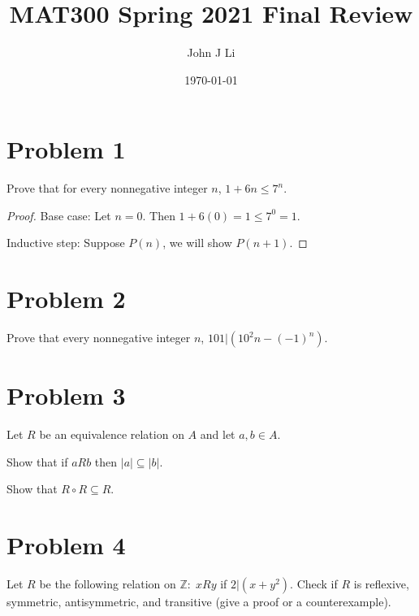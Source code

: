 \documentclass{article}
\title{MAT300 Spring 2021 Final Review}
\date{\today}
\author{John J Li}
\begin{document}
    \maketitle
    \thispagestyle{empty}


    \section*{Problem 1}

    Prove that for every nonnegative integer $n$, $1+6n\leq 7^n$.

    \begin{proof}
        Base case: Let $n=0$. Then $1+6(0) = 1 \leq 7^0 = 1$.

        Inductive step: Suppose $P(n)$, we will show $P(n+1)$.
    \end{proof}


    \section*{Problem 2}

    Prove that every nonnegative integer $n$, $101|(10^2n-(-1)^n)$.
    

    \section*{Problem 3}

    Let $R$ be an equivalence relation on $A$ and let $a,b \in A$.

    Show that if $aRb$ then $|a|\subseteq |b|$.

    Show that $R\circ R\subseteq R$.


    \section*{Problem 4}

    Let $R$ be the following relation on $\mathbb{Z}:\; xRy$ if $2|(x+y^2)$. Check if 
    $R$ is reflexive, symmetric, antisymmetric, and transitive (give a proof or a 
    counterexample).
\end{document}
